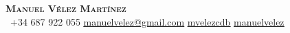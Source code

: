 \begin{center}
    \textbf{\Huge \scshape Manuel Vélez Martínez} \\ \vspace{1pt}
     \ \small +34 687 922 055 \quad
    \href{mailto:manuelvelez@gmail.com}{ \underline{manuelvelez@gmail.com}} \quad
    \href{https://www.linkedin.com/in/mvelezcdb/}{ \underline{mvelezcdb}} \quad
    \href{https://github.com/manuelvelez}{ \underline{manuelvelez}}
\end{center}